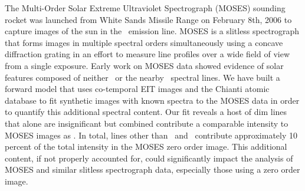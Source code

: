 The Multi-Order Solar Extreme Ultraviolet Spectrograph (MOSES) sounding rocket was launched from White Sands Missile Range on February 8th, 2006 to capture images of the sun in the \heii \ emission line.
MOSES is a slitless spectrograph that forms images in multiple spectral orders simultaneously using a concave diffraction grating in an effort to measure line profiles over a wide field of view from a single exposure.
Early work on MOSES data showed evidence of solar features composed of neither \heii \ or the nearby \sixi \ spectral lines.
We have built a forward model that uses co-temporal EIT images and the Chianti atomic database to fit synthetic images with known spectra to the MOSES data in order to quantify this additional spectral content.
Our fit reveals a host of dim lines that alone are insignificant but combined contribute a comparable intensity to MOSES images as \sixi.
In total, lines other than \heii\ and \sixi\ contribute approximately 10 percent of the total intensity in the MOSES zero order image.
This additional content, if not properly accounted for, could significantly impact the analysis of MOSES and similar slitless spectrograph data, especially those using a zero order image.